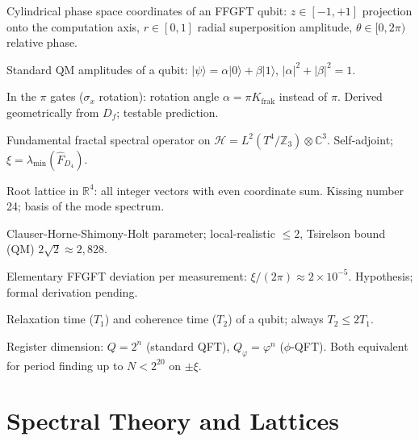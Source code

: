 \begin{description}[leftmargin=4.5em,style=sameline,itemsep=0.4em]
  \item[$(z,r,\theta)$] Cylindrical phase space coordinates of an
    FFGFT qubit: $z\in[-1,+1]$ projection onto the computation axis,
    $r\in[0,1]$ radial superposition amplitude, $\theta\in[0,2\pi)$
    relative phase.
  \item[$(\alpha,\beta)$] Standard QM amplitudes of a qubit:
    $|\psi\rangle = \alpha|0\rangle+\beta|1\rangle$,
    $|\alpha|^2+|\beta|^2 = 1$.
  \item[$K_{\mathrm{frak}}$ (gate)] In the $\pi$ gates
    ($\sigma_x$ rotation): rotation angle $\alpha = \pi K_{\mathrm{frak}}$
    instead of $\pi$. Derived geometrically from $D_f$; testable prediction.
  \item[$\hat F$] Fundamental fractal spectral operator on
    $\mathcal{H} = L^2(T^4/\mathbb{Z}_3)\otimes\mathbb{C}^3$.
    Self-adjoint; $\xi = \lambda_{\min}(\hat F_{D_4})$.
  \item[$D_4$] Root lattice in $\mathbb{R}^4$: all integer vectors with even coordinate sum. Kissing number 24; basis of the
    mode spectrum.
  \item[$\mathrm{CHSH}$] Clauser-Horne-Shimony-Holt parameter;
    local-realistic $\le2$, Tsirelson bound (QM)
    $2\sqrt2\approx2{,}828$.
  \item[$\Delta\mathrm{CHSH}_{\mathrm{elem}}$] Elementary
    FFGFT deviation per measurement: $\xi/(2\pi)\approx2\times10^{-5}$.
    Hypothesis; formal derivation pending.
  \item[$T_1,\,T_2$] Relaxation time ($T_1$) and coherence time ($T_2$)
    of a qubit; always $T_2\le2T_1$.
  \item[$Q,\,Q_\varphi$] Register dimension: $Q = 2^n$ (standard QFT),
    $Q_\varphi = \varphi^n$ ($\phi$-QFT). Both equivalent for
    period finding up to $N < 2^{20}$ on $\pm\xi$.
\end{description}

\section*{Spectral Theory and Lattices}

